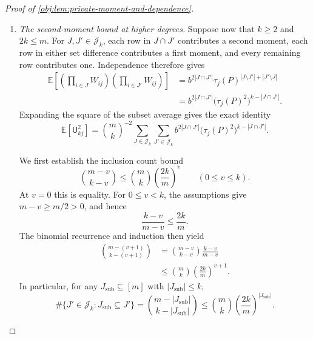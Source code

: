 \begin{proof}[Proof of \cref{obj:lem:private-moment-and-dependence}]
\begin{enumerate}
\item \textit{The second-moment bound at higher degrees.}
Suppose now that \(k\ge2\) and \(2k\le m\). For
\(J,J'\in\mathcal J_k\), each row in \(J\cap J'\) contributes a second moment,
each row in either set difference contributes a first moment, and every
remaining row contributes one. Independence therefore gives
\[
\begin{aligned}
\mathbb E\left[
\left(\prod_{i\in J}W_{ij}\right)
\left(\prod_{i\in J'}W_{ij}\right)\right]
&=
b^{2|J\cap J'|}
\tau_j(P)^{|J\setminus J'|+|J'\setminus J|}\\
&=
b^{2|J\cap J'|}
\bigl(\tau_j(P)^2\bigr)^{k-|J\cap J'|}.
\end{aligned}
\]
Expanding the square of the subset average gives the exact identity
\[
\mathbb E[\mathsf U_{kj}^2]
=
\binom mk^{-2}
\sum_{J\in\mathcal J_k}\sum_{J'\in\mathcal J_k}
b^{2|J\cap J'|}
\bigl(\tau_j(P)^2\bigr)^{k-|J\cap J'|}.
\]

We first establish the inclusion count bound
\[
\binom{m-v}{k-v}
\le
\binom mk\left(\frac{2k}{m}\right)^v
\qquad(0\le v\le k).
\]
At \(v=0\) this is equality. For \(0\le v<k\), the assumptions give
\(m-v\ge m/2>0\), and hence
\[
\frac{k-v}{m-v}\le\frac{2k}{m}.
\]
The binomial recurrence and induction then yield
\[
\begin{aligned}
\binom{m-(v+1)}{k-(v+1)}
&=
\binom{m-v}{k-v}\frac{k-v}{m-v}\\
&\le
\binom mk\left(\frac{2k}{m}\right)^{v+1}.
\end{aligned}
\]
In particular, for any \(J_{\mathrm{sub}}\subseteq[m]\) with
\(|J_{\mathrm{sub}}|\le k\),
\[
\#\{J'\in\mathcal J_k:J_{\mathrm{sub}}\subseteq J'\}
=
\binom{m-|J_{\mathrm{sub}}|}{k-|J_{\mathrm{sub}}|}
\le
\binom mk
\left(\frac{2k}{m}\right)^{|J_{\mathrm{sub}}|}.
\]


\end{enumerate}
\end{proof}
